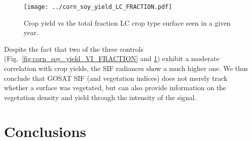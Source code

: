 \documentclass[preprint, a4paper, 10pt, times]{elsarticle}
\begin{document}
\begin{figure}[htbp]
\centering
\texttt{[image: ../corn\_soy\_yield\_LC\_FRACTION.pdf]}
\caption{Crop yield vs the total fraction LC crop type surface seen in a given year.}
\label{fig:corn_soy_yield_LC_FRACTION}
\end{figure}

Despite the fact that two of the three controls (Fig.~\ref{fig:corn_soy_yield_VI_FRACTION} and \ref{fig:corn_soy_yield_LC_FRACTION}) exhibit a moderate correlation with crop yields, the SIF radiances show a much higher one. We thus conclude that GOSAT SIF (and vegetation indices) does not merely track whether a surface was vegetated, but can also provide information on the vegetation density and yield through the intensity of the signal. 


\section{Conclusions}



\section*{}

\end{document}
